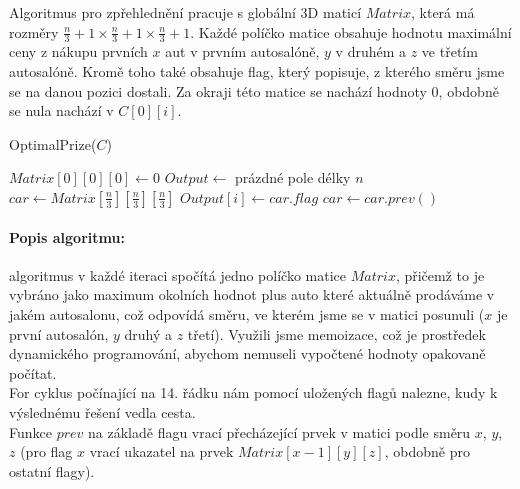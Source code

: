 \documentclass[12pt]{iv003}
\begin{document}
Algoritmus pro zpřehlednění pracuje s globální 3D maticí $Matrix$, která má rozměry $\frac{n}{3}+1 \times \frac{n}{3}+1 \times \frac{n}{3}+1$. Každé políčko matice obsahuje hodnotu maximální ceny z nákupu prvních $x$ aut v prvním autosalóně, $y$ v druhém a $z$ ve třetím autosalóně. Kromě toho také obsahuje flag, který popisuje, z kterého směru jsme se na danou pozici dostali. Za okraji této matice se nachází hodnoty 0, obdobně se nula nachází v $C[0][i]$.


{\small \begin{procedure}[H]
    \caption{OptimalPrize($C$) }
    $Matrix[0][0][0] \leftarrow 0$ 
    $Output \leftarrow $ prázdné pole délky $n$ \;
    $car \leftarrow Matrix[\frac{n}{3}][\frac{n}{3}][\frac{n}{3}]$ \;
     {
		$Output[i] \leftarrow car.flag$ 
		$car \leftarrow car.prev()$ 
    }
\end{procedure}}
\paragraph{Popis algoritmu:} algoritmus v každé iteraci spočítá jedno políčko matice $Matrix$, přičemž to je vybráno jako maximum okolních hodnot plus auto které aktuálně prodáváme v jakém autosalonu, což odpovídá směru, ve kterém jsme se v matici posunuli ($x$ je první autosalón, $y$ druhý a $z$ třetí). Využili jsme memoizace, což je prostředek dynamického programování, abychom nemuseli vypočtené hodnoty opakovaně počítat.\\
For cyklus počínající na 14. řádku nám pomocí uložených flagů nalezne, kudy k výslednému řešení vedla cesta.\\
Funkce $prev$ na základě flagu vrací přecházející prvek v matici podle směru $x$, $y$, $z$ (pro flag $x$ vrací ukazatel na prvek $Matrix[x-1][y][z]$, obdobně pro ostatní flagy).
\end{document}
